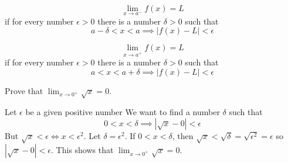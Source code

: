 \begin{definition}
    \[\lim_{x\to a^-}f(x)=L\]
    if for every number \(\epsilon>0\) there is a number \(\delta>0\) such
    that
    \[a-\delta<x<a\implies|f(x)-L|<\epsilon\]
\end{definition}
\begin{definition}
    \[\lim_{x\to a^+}f(x)=L\]
    if for every number \(\epsilon>0\) there is a number \(\delta>0\) such
    that
    \[a<x<a+\delta\implies|f(x)-L|<\epsilon\]
\end{definition}
\begin{problem}
    Prove that \(\displaystyle{\lim_{x\to 0^+}\sqrt{x}=0}\).
\end{problem}
\begin{solution}
    Let \(\epsilon\) be a given positive number
    We want to find a number \(\delta\) such that
    \[0<x<\delta\implies|\sqrt{x}-0|<\epsilon\]
    But \(\sqrt{x}<\epsilon\iff x<\epsilon^2\).
    Let \(\delta=\epsilon^2\).
    If \(0<x<\delta\), then
    \(\sqrt{x}<\sqrt{\delta}=\sqrt{\epsilon^2}=\epsilon\)
    so \(|\sqrt{x}-0|<\epsilon\).
    This shows that \(\displaystyle{\lim_{x\to 0^+}\sqrt{x}=0}\).
\end{solution}